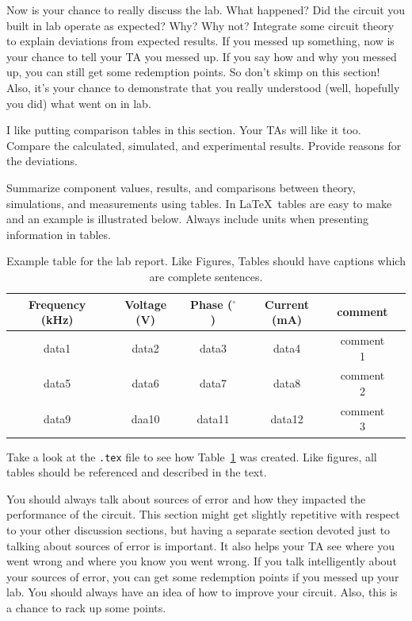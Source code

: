\documentclass[11pt]{article}
\begin{document}
Now is your chance to really discuss the lab. What happened? Did the circuit you built in lab operate as expected? Why? Why not? Integrate some circuit theory to explain deviations from expected results. If you messed up something, now is your chance to tell your TA you messed up. If you say how and why you messed up, you can still get some redemption points. So don’t skimp on this section! Also, it’s your chance to demonstrate that you really understood (well, hopefully you did) what went on in lab.

I like putting comparison tables in this section. Your TAs will like it too. Compare the calculated, simulated, and experimental results. Provide reasons for the deviations.

Summarize component values, results, and comparisons between theory, simulations, and measurements using tables.  In \LaTeX\, tables are easy to make and an example is illustrated below.  Always include units when presenting information in tables.

\begin{table}[ht]
\centering
\begin{tabular}{ |c|c|c|c|c|p{2in}| } 
 \hline\hline
 Frequency (kHz) & Voltage (V) & Phase ($^\circ$) & Current (mA) & comment  \\\hline\hline 
 data1 & data2 & data3 & data4 & comment 1 \\ \hline
 data5 & data6 & data7 & data8 & comment 2\\ \hline
 data9  & daa10 & data11 & data12 & comment 3\\ 
 \hline\hline
\end{tabular}
\caption{Example table for the lab report. Like Figures, Tables should have captions which are complete sentences.}
\label{table_ex}
\end{table}

Take a look at the {\tt .tex} file to see how Table~\ref{table_ex} was created. Like figures, all tables should be referenced and described in the text.

You should always talk about sources of error and how they impacted the performance of the circuit. This section might get slightly repetitive with respect to your other discussion sections, but having a separate section devoted just to talking about sources of error is important. It also helps your TA see where you went wrong and where you know you went wrong. If you talk intelligently about your sources of error, you can get some redemption points if you messed up your lab. You should always have an idea of how to improve your circuit. Also, this is a chance to rack up some points.
\end{document}
